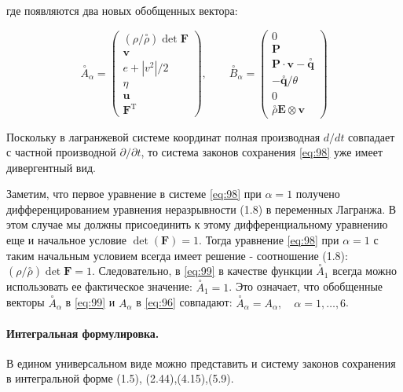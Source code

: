 где появляются два новых обобщенных вектора:

\begin{equation}
\stackrel{\circ}{A}_{\alpha}=\left(\begin{array}{c}
(\rho / \stackrel{\circ}{\rho})  \det \mathbf{F}  \label{eq:99}\\
\mathbf{v} \\
e+\left|v^{2}\right| / 2 \\
\eta \\
\mathbf{u} \\
\mathbf{F}^{\mathrm{T}}
\end{array}\right), \quad \quad \stackrel{\circ}{B}_{\alpha}=\left(\begin{array}{c}
0 \\
\mathbf{P} \\
\mathbf{P} \cdot \mathbf{v}-\stackrel{\circ}{\mathbf{q}} \\
-\stackrel{\circ}{\mathbf{q}} / \theta \\
0 \\
\stackrel{\circ}{\rho}{\mathbf{E}} \otimes \mathbf{v}
\end{array}\right)
\end{equation}

Поскольку в лагранжевой системе координат полная производная $d / d t$ совпадает с частной производной $\partial / \partial t$, то система законов сохранения \eqref{eq:98} уже имеет дивергентный вид.

\begin{remark}Заметим, что первое уравнение в системе \eqref{eq:98} при $\alpha=1$ получено дифференцированием уравнения неразрывности (1.8) в переменных Лагранжа.
В этом случае мы должны присоединить к этому дифференциальному уравнению еще и начальное условие $\det (\mathbf{F}) =1$. 
Тогда уравнение \eqref{eq:98} при $\alpha=1$ с таким начальным условием всегда имеет решение - соотношение (1.8): $(\rho / \stackrel{\circ}{\rho}) \det  \mathbf{F}=1$. 
Следовательно, в \eqref{eq:99} в качестве функции $\stackrel{\circ}{A}_{1}$ всегда можно использовать ее фактическое значение: $\stackrel{\circ}{A}_{1}=1$.
Это означает, что обобщенные векторы $\stackrel{\circ}{A}_{\alpha}$ в \eqref{eq:99} и $A_{\alpha}$ в \eqref{eq:96} совпадают: $\stackrel{\circ}{A}_{\alpha}=A_{\alpha}, \quad \alpha=1, \ldots, 6$.
\end{remark}

\paragraph{Интегральная формулировка.}
В едином универсальном виде можно представить и систему законов сохранения в интегральной форме (1.5), (2.44),(4.15),(5.9).

